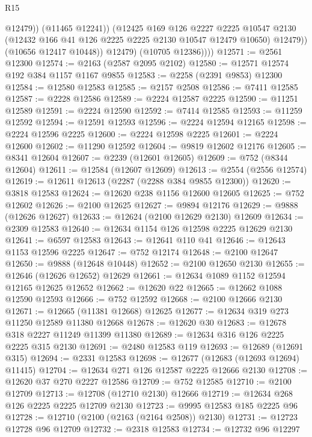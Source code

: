 \begin{lexlean}{R15}
\begin{coremodule}
                      @12479))
                  (@11465 @12241))
                (@12425
                  @169
                  @126
                  @2227
                  @2225
                  @10547
                  @2130
                  (@12432 @166 @41 @126 @2225 @2225 @2130 @10547 @12479 @10650)
                  @12479))
              (@10656 @12417 @10448))
            @12479)
          (@10705 @12386))))
@12571 := @2561 @12300
@12574 := @2163 (@2587 @2095 @2102)
@12580 := @12571 @12574 @192 @384 @1157 @1167 @9855
@12583 := @2258 (@2391 @9853) @12300
@12584 := @12580 @12583
@12585 := @2157 @2508
@12586 := @7411 @12585
@12587 := @2228 @12586
@12589 := @2224 @12587 @2225
@12590 := @11251 @12589
@12591 := @2224 @12590
@12592 := @7414 @12585
@12593 := @11259 @12592
@12594 := @12591 @12593
@12596 := @2224 @12594 @12165
@12598 := @2224 @12596 @2225
@12600 := @2224 @12598 @2225
@12601 := @2224 @12600
@12602 := @11290 @12592
@12604 := @9819 @12602 @12176
@12605 := @8341 @12604
@12607 := @2239 (@12601 @12605)
@12609 := @752 (@8344 @12604)
@12611 := @12584 (@12607 @12609)
@12613 := @2554 (@2556 @12574)
@12619 := @12611 @12613 (@2287 (@2288 @384 @9855 @12300))
@12620 := @3818 @12583
@12624 := @12620 @238 @1156 @12600 @12605
@12625 := @752 @12602
@12626 := @2100 @12625
@12627 := @9894 @12176
@12629 := @9888 (@12626 @12627)
@12633 := @12624 (@2100 @12629 @2130) @12609
@12634 := @2309 @12583
@12640 := @12634 @1154 @126 @12598 @2225 @12629 @2130
@12641 := @6597 @12583
@12643 := @12641 @110 @41
@12646 := @12643 @1153 @12596 @2225
@12647 := @752 @12174
@12648 := @2100 @12647
@12650 := @9888 (@12648 @10448)
@12652 := @2100 @12650 @2130
@12655 := @12646 (@12626 @12652) @12629
@12661 := @12634 @1089 @1152 @12594 @12165 @12625 @12652
@12662 := @12620 @22
@12665 := @12662 @1088 @12590 @12593
@12666 := @752 @12592
@12668 := @2100 @12666 @2130
@12671 := @12665 (@11381 @12668) @12625
@12677 := @12634 @319 @273 @11250 @12589 @11380 @12668
@12678 := @12620 @30
@12683 := @12678 @318 @2227 @11249 @11399 @11380
@12689 := @12634 @316 @126 @2225 @2225 @315 @2130
@12691 := @2480 @12583 @119
@12693 := @12689 (@12691 @315)
@12694 := @2331 @12583
@12698 := @12677 (@12683 (@12693 @12694) @11415)
@12704 := @12634 @271 @126 @12587 @2225 @12666 @2130
@12708 := @12620 @37 @270 @2227 @12586
@12709 := @752 @12585
@12710 := @2100 @12709
@12713 := @12708 (@12710 @2130) @12666
@12719 := @12634 @268 @126 @2225 @2225 @12709 @2130
@12723 := @9995 @12583 @185 @2225 @96
@12728 := @12710 (@2100 (@2163 (@2164 @2508)) @2130)
@12731 := @12723 @12728 @96 @12709
@12732 := @2318 @12583
@12734 := @12732 @96 @12297

\end{coremodule}
\end{lexlean}
